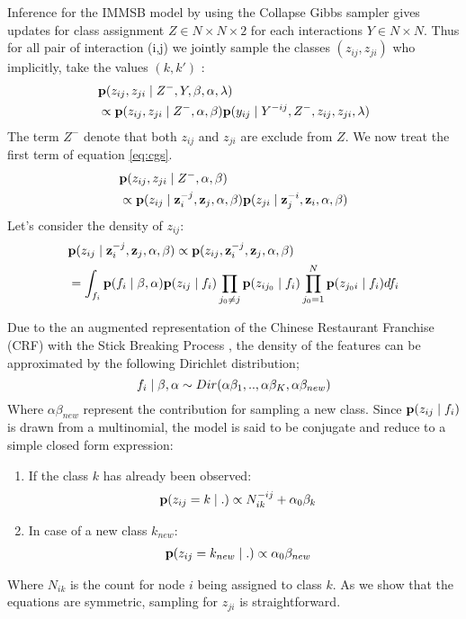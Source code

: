 Inference for the IMMSB model by using the Collapse Gibbs sampler gives updates for class assignment $Z \in N\times N \times 2$ for each interactions $Y \in N\times N$. Thus for all pair of interaction (i,j) we jointly sample the classes $(z_{ij}, z_{ji})$ who implicitly, take the values $(k,k')$ :
\begin{align} \label{eq:cgs}
&\pr(z_{ij}, z_{ji} \mid Z^-, Y,  \mat{\beta}, \alpha, \mat{\lambda} )  \\
&\propto\pr(z_{ij}, z_{ji} \mid Z^-, \alpha,\mat{\beta}) \pr(y_{ij} \mid Y^{-ij},  Z^-,z_{ij}, z_{ji},  \mat{\lambda} ) \nonumber
\end{align}
The term $Z^-$ denote that both $z_{ij}$ and $z_{ji}$ are exclude from $Z$. We now treat the first term of equation \ref{eq:cgs}.  
\begin{align}
& \mathbf{p}(z_{ij}, z_{ji} \mid Z^-, \alpha,\mathbf{\beta})\\
&\propto \mathbf{p}(z_{ij} \mid \mathbf{z}_i^{-j}, \mathbf{z}_j, \alpha,\mathbf{\beta})  \mathbf{p}(z_{ji} \mid \mathbf{z}_j^{-i}, \mathbf{z}_i, \alpha,\mathbf{\beta}) \nonumber
\end{align}
Let's consider the density of $z_{ij}$:
\begin{align}
&\mathbf{p}(z_{ij} \mid \mathbf{z}_i^{-j}, \mathbf{z}_j, \alpha,\mathbf{\beta}) \propto \mathbf{p}(z_{ij},  \mathbf{z}_i^{-j}, \mathbf{z}_j, \alpha,\mathbf{\beta}) \\
&= \int_{f_i} \mathbf{p}(f_i \mid \mathbf{\beta}, \alpha) \mathbf{p}(z_{ij} \mid f_i) \prod_{j_0\neq j} \mathbf{p}(z_{ij_0} \mid f_i) \prod_{j_0 =  1}^N  \mathbf{p}(z_{j_0 i} \mid f_i)  df_i \nonumber
\end{align}


Due to the an augmented representation of the Chinese Restaurant Franchise (CRF) with the Stick Breaking Process \cite{HDP}, the density of the features can be approximated by the following Dirichlet distribution;
\begin{equation}
f_i \mid \mathbf{\beta}, \alpha \sim Dir(\alpha \beta_1,..,\alpha\beta_K, \alpha\beta_{new})
\end{equation}
Where $\alpha\beta_{new}$ represent the contribution for sampling a new class. Since $\mathbf{p}(z_{ij} \mid f_i)$ is drawn from a multinomial, the model is said to be conjugate and reduce to a simple closed form expression:
\begin{enumerate}
\item If the class $k$ has already been observed:
   \begin{align}
    \pr(z_{ij} =k \mid .) &\propto N_{ik}^{-ij} + \alpha_0 \beta_k
    \label{eq:update-immsb}
   \end{align}
\item In case of a new class $k_{new}$:
   \begin{align}
    \mathbf{p}(z_{ij} =k_{new} \mid.) &\propto \alpha_0 \beta_{new} \nonumber   
   \end{align}
\end{enumerate}
 Where  $N_{ik}$ is the count for node $i$ being assigned to class $k$. As we show that the equations are symmetric, sampling for $z_{ji}$ is straightforward.

